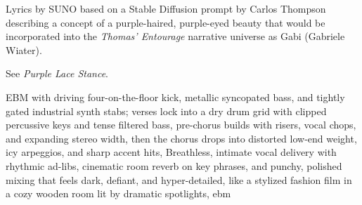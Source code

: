 
\begin{notes}
Lyrics by SUNO based on a Stable Diffusion prompt by Carlos Thompson describing a concept of a purple-haired, purple-eyed beauty %
that would be incorporated into the \emph{Thomas’ Entourage} narrative universe as Gabi (Gabriele Wiater).

See \emph{Purple Lace Stance}.
\end{notes}
\begin{style}
EBM with driving four-on-the-floor kick, metallic syncopated bass, and tightly gated industrial synth stabs; verses lock into a dry drum grid with clipped percussive keys and tense filtered bass, pre-chorus builds with risers, vocal chops, and expanding stereo width, then the chorus drops into distorted low-end weight, icy arpeggios, and sharp accent hits, Breathless, intimate vocal delivery with rhythmic ad-libs, cinematic room reverb on key phrases, and punchy, polished mixing that feels dark, defiant, and hyper-detailed, like a stylized fashion film in a cozy wooden room lit by dramatic spotlights, ebm
\end{style}
